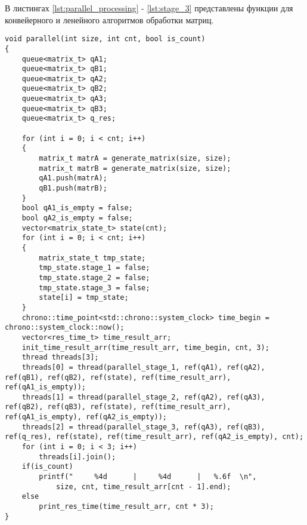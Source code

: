 В листингах \ref{lst:parallel_processing} - \ref{lst:stage_3} представлены функции для конвейерного и ленейного алгоритмов обработки матриц.
\newpage
\begin{lstlisting}[label=lst:parallel_processing,caption=Функция алгоритма конвейерной обработки матрицы]
void parallel(int size, int cnt, bool is_count)
{
    queue<matrix_t> qA1;
    queue<matrix_t> qB1;
    queue<matrix_t> qA2;
    queue<matrix_t> qB2;
    queue<matrix_t> qA3;
    queue<matrix_t> qB3;
    queue<matrix_t> q_res;

    for (int i = 0; i < cnt; i++)
    {
        matrix_t matrA = generate_matrix(size, size);
        matrix_t matrB = generate_matrix(size, size);
        qA1.push(matrA);
        qB1.push(matrB);
    }
    bool qA1_is_empty = false;
    bool qA2_is_empty = false;
    vector<matrix_state_t> state(cnt);
    for (int i = 0; i < cnt; i++)
    {
        matrix_state_t tmp_state;
        tmp_state.stage_1 = false;
        tmp_state.stage_2 = false;
        tmp_state.stage_3 = false;
        state[i] = tmp_state;
    }
    chrono::time_point<std::chrono::system_clock> time_begin = chrono::system_clock::now();
    vector<res_time_t> time_result_arr;
    init_time_result_arr(time_result_arr, time_begin, cnt, 3);
    thread threads[3];
    threads[0] = thread(parallel_stage_1, ref(qA1), ref(qA2), ref(qB1), ref(qB2), ref(state), ref(time_result_arr), ref(qA1_is_empty));
    threads[1] = thread(parallel_stage_2, ref(qA2), ref(qA3), ref(qB2), ref(qB3), ref(state), ref(time_result_arr), ref(qA1_is_empty), ref(qA2_is_empty));
    threads[2] = thread(parallel_stage_3, ref(qA3), ref(qB3), ref(q_res), ref(state), ref(time_result_arr), ref(qA2_is_empty), cnt);
    for (int i = 0; i < 3; i++)
        threads[i].join();
    if(is_count)
        printf("     %4d      |     %4d      |   %.6f  \n",
            size, cnt, time_result_arr[cnt - 1].end);
    else
        print_res_time(time_result_arr, cnt * 3);
}
\end{lstlisting}

